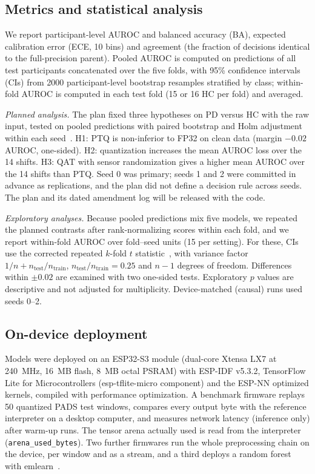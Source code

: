 \documentclass[preprint,12pt]{elsarticle}
\begin{document}
\subsection{Metrics and statistical analysis}
We report participant-level AUROC and balanced accuracy (BA), expected calibration error (ECE, 10 bins) and agreement (the fraction of decisions identical to the full-precision parent). Pooled AUROC is computed on predictions of all test participants concatenated over the five folds, with 95\% confidence intervals (CIs) from 2000 participant-level bootstrap resamples stratified by class; within-fold AUROC is computed in each test fold (15 or 16 HC per fold) and averaged.

\emph{Planned analysis.} The plan fixed three hypotheses on PD versus HC with the raw input, tested on pooled predictions with paired bootstrap and Holm adjustment within each seed~\cite{Holm1979}. H1: PTQ is non-inferior to FP32 on clean data (margin $-0.02$ AUROC, one-sided). H2: quantization increases the mean AUROC loss over the 14 shifts. H3: QAT with sensor randomization gives a higher mean AUROC over the 14 shifts than PTQ. Seed 0 was primary; seeds 1 and 2 were committed in advance as replications, and the plan did not define a decision rule across seeds. The plan and its dated amendment log will be released with the code.

\emph{Exploratory analyses.} Because pooled predictions mix five models, we repeated the planned contrasts after rank-normalizing scores within each fold, and we report within-fold AUROC over fold--seed units (15 per setting). For these, CIs use the corrected repeated $k$-fold $t$ statistic~\cite{Nadeau2003,Bouckaert2004}, with variance factor $1/n + n_{\text{test}}/n_{\text{train}}$, $n_{\text{test}}/n_{\text{train}} = 0.25$ and $n-1$ degrees of freedom. Differences within $\pm0.02$ are examined with two one-sided tests. Exploratory $p$ values are descriptive and not adjusted for multiplicity. Device-matched (causal) runs used seeds 0--2.

\subsection{On-device deployment}
\label{sec:device}
Models were deployed on an ESP32-S3 module (dual-core Xtensa LX7 at 240~MHz, 16~MB flash, 8~MB octal PSRAM) with ESP-IDF v5.3.2, TensorFlow Lite for Microcontrollers (esp-tflite-micro component) and the ESP-NN optimized kernels, compiled with performance optimization. A benchmark firmware replays 50 quantized PADS test windows, compares every output byte with the reference interpreter on a desktop computer, and measures network latency (inference only) after warm-up runs. The tensor arena actually used is read from the interpreter (\texttt{arena\_used\_bytes}). Two further firmwares run the whole preprocessing chain on the device, per window and as a stream, and a third deploys a random forest with emlearn~\cite{emlearn}.
\end{document}
